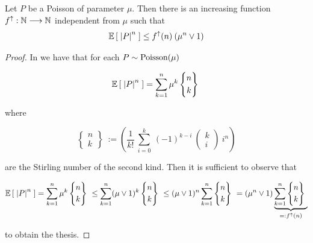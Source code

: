 \begin{lemma}
	\label{app:Poisson-moments}
	Let $P$ be a Poisson \rv of parameter $\mu$.
	Then there is an increasing function $f^\uparrow: \mathbb{N} \longrightarrow \mathbb{N}$ independent from $\mu$ such that 
	\begin{equation*}
		\mathbb{E} \left[ \; \left| P \right|^n \; \right] \leq  f^\uparrow(n)\: (\mu^n \vee 1)
	\end{equation*}
\end{lemma}

\begin{proof}
	In \cite[Equation (1.3-14)]{handbook-poisson} we have that for each $P \sim \text{Poisson}(\mu)$
	
	\begin{equation*}
		\mathbb{E} \left[ \; 
			\left| P \right|^n
		 \; \right]
		=
		\sum_{k=1}^{n}
		\mu^k
		\left\{
		\begin{gathered}
			n
			\\
			k
		\end{gathered}
		\right\}\
	\end{equation*}
	
	where 
	
	\begin{equation*}
		\left\{
		\begin{gathered}
			n
			\\
			k
		\end{gathered}
		\right\}\ := \left(
		\frac{1}{k!}\
		\sum_{i=0}^{k}\
		(-1)^{k-i}\
		\left(
		\begin{gathered}
			k
			\\
			i
		\end{gathered}
		\right)\
		i^n
		\right)
	\end{equation*}
	
	are the Stirling number of the second kind.
	Then it is sufficient to observe that
	
	\begin{equation*}
		\E{
			\abs{P}^n
		}
		=
		\sum_{k=1}^{n}
		\mu^k
		\left\{
		\begin{gathered}
			n
			\\
			k
		\end{gathered}
		\right\}\
		\leq
		\sum_{k=1}^{n}
		(\mu \vee 1)^k
		\left\{
		\begin{gathered}
			n
			\\
			k
		\end{gathered}
		\right\}\
		\leq
		(\mu \vee 1)^n
		\sum_{k=1}^{n}
		\left\{
		\begin{gathered}
			n
			\\
			k
		\end{gathered}
		\right\}\		
		=
		(\mu^n \vee 1)
		\underbrace{
			\sum_{k=1}^{n}
			\left\{
			\begin{gathered}
				n
				\\
				k
			\end{gathered}
			\right\}\
		}_{=:\Fup(n)}
	\end{equation*}
	
	to obtain the thesis.
\end{proof}

